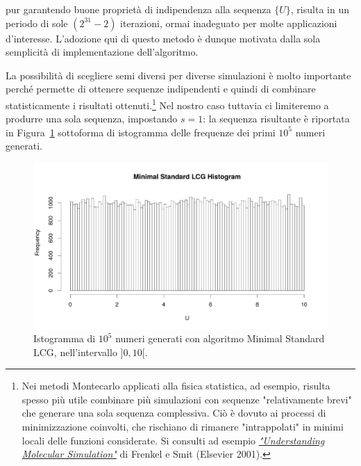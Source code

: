 \noindent pur garantendo buone proprietà di indipendenza alla sequenza $\{U\}$, risulta in un periodo di sole $(2^{31}-2)$ iterazioni, ormai inadeguato per molte applicazioni d'interesse. L'adozione qui di questo metodo è dunque motivata dalla sola semplicità di implementazione dell'algoritmo.\\

\vfill

\noindent La possibilità di scegliere semi diversi per diverse simulazioni è molto importante perché permette di ottenere sequenze indipendenti e quindi di combinare statisticamente i risultati ottenuti.\footnote{Nei metodi Montecarlo applicati alla fisica statistica, ad esempio, risulta spesso più utile combinare più simulazioni con sequenze "relativamente brevi" che generare una sola sequenza complessiva. Ciò è dovuto ai processi di minimizzazione coinvolti, che rischiano di rimanere "intrappolati" in minimi locali delle funzioni considerate. Si consulti ad esempio \href{https://www.elsevier.com/books/understanding-molecular-simulation/frenkel/978-0-12-267351-1}{\textsl{"Understanding Molecular Simulation"}} di Frenkel e Smit (Elsevier 2001).} Nel nostro caso tuttavia ci limiteremo a produrre una sola sequenza, impostando $s=1$: la sequenza risultante è riportata in Figura~\ref{fig:LCGhist} sottoforma di istogramma delle frequenze dei primi $10^5$ numeri generati.\\

\vfill

\begin{figure}
	\centering
	\includegraphics[width=\textwidth, trim={0 3cm 0 0}, clip]{Immagini/LCG_histogram.pdf}
	\caption{Istogramma di $10^5$ numeri generati con algoritmo Minimal Standard LCG, nell'intervallo $]0,10[$.}
	\label{fig:LCGhist}
\end{figure}

